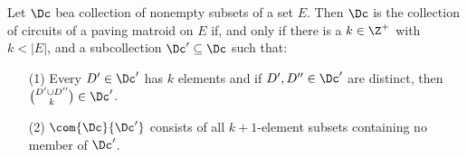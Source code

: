 \begin{theorem}\label{1.3.6}
    Let $\Dc$ bea collection of nonempty subsets of a set $E$. Then  $\Dc$ is
    the collection of circuits of a paving matroid on  $E$ if, and only if there
    is a  $k \in \Z^+$ with  $k<|E|$, and a subcollection  $\Dc' \subseteq \Dc$
    such that:
    \begin{enumerate}
        \item[(1)] Every $D' \in \Dc'$ has  $k$ elements and if  $D',D'' \in
            \Dc'$ are distinct, then ${D' \cup D'' \choose k} \in \Dc'$.

        \item[(2)] $\com{\Dc}{\Dc'}$ consists of all $k+1$-element subsets
            containing no member of  $\Dc'$.
    \end{enumerate}
\end{theorem}
